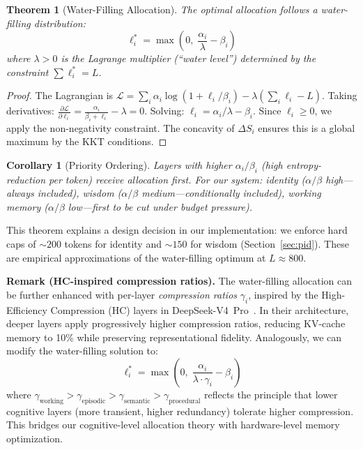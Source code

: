 \documentclass[11pt,a4paper]{article}
\newtheorem{theorem}{Theorem}
\newtheorem{corollary}{Corollary}
\begin{document}
\begin{theorem}[Water-Filling Allocation]
\label{thm:waterfill}
The optimal allocation follows a water-filling distribution:
\begin{equation}
  \ell_i^* = \max\left(0, \; \frac{\alpha_i}{\lambda} - \beta_i\right)
  \label{eq:waterfill}
\end{equation}
where $\lambda > 0$ is the Lagrange multiplier (``water level'') determined
by the constraint $\sum \ell_i^* = L$.
\end{theorem}

\begin{proof}
The Lagrangian is $\mathcal{L} = \sum_i \alpha_i \log(1 + \ell_i/\beta_i)
- \lambda(\sum_i \ell_i - L)$.
Taking derivatives: $\frac{\partial \mathcal{L}}{\partial \ell_i}
= \frac{\alpha_i}{\beta_i + \ell_i} - \lambda = 0$.
Solving: $\ell_i = \alpha_i / \lambda - \beta_i$.
Since $\ell_i \geq 0$, we apply the non-negativity constraint.
The concavity of $\Delta S_i$ ensures this is a global maximum
by the KKT conditions.
\end{proof}

\begin{corollary}[Priority Ordering]
Layers with higher $\alpha_i / \beta_i$ (high entropy-reduction per token)
receive allocation first. For our system:
identity ($\alpha/\beta$ high---always included),
wisdom ($\alpha/\beta$ medium---conditionally included),
working memory ($\alpha/\beta$ low---first to be cut under budget pressure).
\end{corollary}

This theorem explains a design decision in our implementation: we enforce
hard caps of $\sim\!200$ tokens for identity and $\sim\!150$ for wisdom
(Section~\ref{sec:pid}). These are empirical approximations of the
water-filling optimum at $L \approx 800$.

\noindent\textbf{Remark (HC-inspired compression ratios).}
The water-filling allocation can be further enhanced with per-layer
\emph{compression ratios} $\gamma_i$, inspired by the High-Efficiency
Compression (HC) layers in DeepSeek-V4~Pro~\cite{deepseek_v4_2026}. In their
architecture, deeper layers apply progressively higher compression ratios,
reducing KV-cache memory to 10\% while preserving representational fidelity.
Analogously, we can modify the water-filling solution to:
\begin{equation}
  \ell_i^* = \max\!\left(0, \; \frac{\alpha_i}{\lambda \cdot \gamma_i} - \beta_i\right)
  \label{eq:hc_waterfill}
\end{equation}
where $\gamma_{\text{working}} > \gamma_{\text{episodic}} > \gamma_{\text{semantic}} > \gamma_{\text{procedural}}$
reflects the principle that lower cognitive layers (more transient, higher
redundancy) tolerate higher compression. This bridges our cognitive-level
allocation theory with hardware-level memory optimization.
\end{document}
